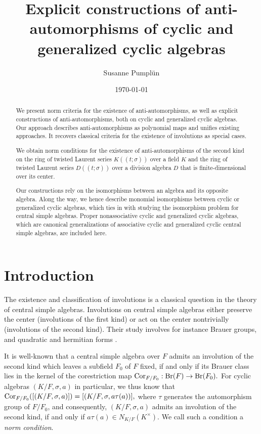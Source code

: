 \documentclass{amsart}
\author{Susanne Pumpl\"un}
\date{\today}
\theoremstyle{plain}
\theoremstyle{definition}
\numberwithin{equation}{section}
\numberwithin{figure}{section}
\begin{document}
    \title{Explicit constructions of anti-automorphisms of cyclic and generalized cyclic algebras}
    \maketitle

\begin{abstract}
We present norm criteria for the existence of anti-automorphisms, as well as explicit constructions of anti-automorphisms, both on cyclic and generalized cyclic algebras. Our approach describes anti-automorphisms as polynomial maps and unifies existing approaches. It recovers classical criteria for the existence of involutions as special cases.

 We obtain  norm conditions for the existence of anti-automorphisms of the second kind 
 on the ring of twisted Laurent series $K((t;\sigma))$ over a field $K$ and the ring of twisted Laurent series $D((t;\sigma))$  over a division algebra $D$ that is finite-dimensional over its center.

 Our constructions rely on the isomorphisms between an algebra and its opposite algebra. Along the way, we hence describe monomial isomorphisms between cyclic or generalized cyclic algebras,
  which ties in with studying the isomorphism problem for central simple algebras. Proper nonassociative cyclic and generalized cyclic algebras,  which are canonical generalizations of associative cyclic and generalized cyclic central simple algebras, are included here.
\end{abstract}

    \section{Introduction}



The existence and classification of involutions is a classical question in the theory of central simple algebras. Involutions on central simple algebras either preserve the center (involutions of the first kind) or act on the center nontrivially (involutions of the second kind). Their study involves for instance Brauer groups, and quadratic and hermitian forms \cite{KMRT}.

 It is well-known that a central simple algebra  over $F$ admits an involution of the second kind which leaves a subfield $F_0$ of $F$ fixed, if and only if its Brauer class lies in the kernel of the corestriction map
${\rm Cor}_{F/F_0}:\mathrm{Br}(F)\to \mathrm{Br}(F_0).$ For cyclic algebras $(K/F,\sigma,a)$ in particular, we thus know that
${\rm Cor}_{F/F_0}([(K/F,\sigma,a)])=[(K/F,\sigma,a\tau(a))],$ where $\tau$ generates the automorphism group of $F/F_0$,
and consequently, $(K/F,\sigma,a)$ admits an involution of the second kind, if and only if
$a\tau(a)\in N_{K/F}(K^\times).$ We call such a condition  a \emph{norm condition}.
\end{document}
